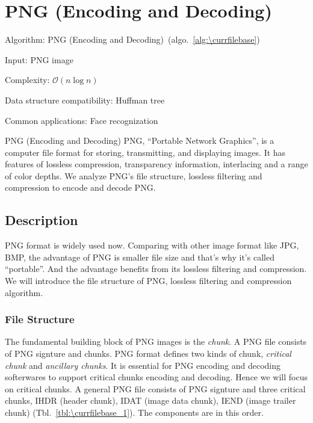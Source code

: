 \documentclass[catalog.tex]{subfiles}
\begin{document}
%
%

\def\pbname{PNG (Encoding and Decoding)} %

\section{\pbname}

\begin{overview}
\item [Algorithm:] PNG (Encoding and Decoding)~(algo.~\ref{alg:\currfilebase})
\item [Input:] PNG image
\item [Complexity:] $\mathcal{O}(n\log{n})$
\item [Data structure compatibility:] Huffman tree
\item [Common applications:] Face recognization
\end{overview}


\begin{problem}{\pbname}
	PNG\cite{Ch.1}, ``Portable Network Graphics'', is a computer file format for storing, transmitting, and displaying images. It has features of lossless compression, transparency information, interlacing and a range of color depths. We analyze PNG's file structure, lossless filtering and compression to encode and decode PNG.
\end{problem}


\subsection*{Description}
PNG format is widely used now. Comparing with other image format like JPG, BMP, the advantage of PNG is smaller file size and that's why it's called ``portable''. And the advantage benefits from its lossless filtering and compression. We will introduce the file structure of PNG, lossless filtering and compression algorithm.

	\subsubsection*{File Structure}
	The fundamental building block of PNG images is the {\it chunk}\cite{Ch.8}. A PNG file consists of PNG signture and chunks. PNG format defines two kinds of chunk, {\it critical chunk} and {\it ancillary chunks}. It is essential for PNG encoding and decoding softerwares to support critical chunks encoding and decoding. Hence we will focus on critical chunks. A general PNG file consists of PNG signture and three critical chunks, IHDR (header chunk), IDAT (image data chunk), IEND (image trailer chunk) (Tbl.~\ref{tbl:\currfilebase_1}). The components are in this order.
\end{document}
